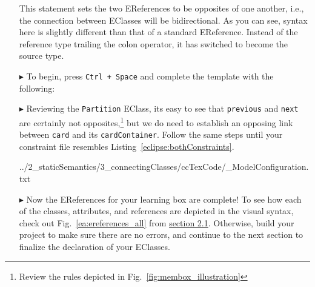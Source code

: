 \begin{itemize}
This statement sets the two EReferences to be opposites of one another, i.e., the connection between EClasses will be bidirectional. As you can see, syntax here
is slightly different than that of a standard EReference. Instead of the reference type trailing the colon operator, it has switched to become the source type.

\vspace{0.5cm}

\item[$\blacktriangleright$] To begin, press \texttt{Ctrl + Space} and complete
the template with the following:


\item[$\blacktriangleright$] Reviewing the \texttt{Partition} EClass, its easy to see that \texttt{previous} and \texttt{next} are certainly not
opposites,\footnote{Review the rules depicted in Fig.~\ref{fig:membox_illustration}} but we do need to establish an opposing link between
\texttt{card} and its \texttt{cardContainer}. Follow the same steps until your constraint file resembles Listing~\ref{eclipse:bothConstraints}.

\vspace{5mm}

 {../2_staticSemantics/3_connectingClasses/ccTexCode/_ModelConfiguration.txt} 

\newpage

\item[$\blacktriangleright$] Now the EReferences for your learning box are complete! To see how each of the classes, attributes, and references
are depicted in the visual syntax, check out Fig.~\ref{ea:ereferences_all} from \hyperlink{sec:static vis}{section 2.1}. Otherwise, build your project to
make sure there are no errors, and continue to the next section to finalize the declaration of your EClasses.


\end{itemize}
